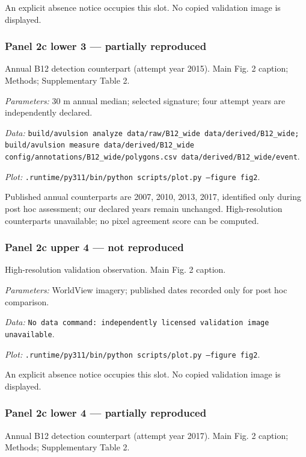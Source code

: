 An explicit absence notice occupies this slot. No copied validation image is displayed.

\subsubsection*{Panel 2c lower 3 --- partially reproduced}
Annual B12 detection counterpart (attempt year 2015). Main Fig. 2 caption; Methods; Supplementary Table 2.

\textit{Parameters:} 30 m annual median; selected signature; four attempt years are independently declared.

\textit{Data:} \texttt{build/\allowbreak{}avulsion analyze data/\allowbreak{}raw/\allowbreak{}B12\_wide data/\allowbreak{}derived/\allowbreak{}B12\_wide; build/\allowbreak{}avulsion measure data/\allowbreak{}derived/\allowbreak{}B12\_wide config/\allowbreak{}annotations/\allowbreak{}B12\_wide/\allowbreak{}polygons.csv data/\allowbreak{}derived/\allowbreak{}B12\_wide/\allowbreak{}event}.

\textit{Plot:} \texttt{.runtime/\allowbreak{}py311/\allowbreak{}bin/\allowbreak{}python scripts/\allowbreak{}plot.py --figure fig2}.

Published annual counterparts are 2007, 2010, 2013, 2017, identified only during post hoc assessment; our declared years remain unchanged. High-resolution counterparts unavailable; no pixel agreement score can be computed.

\subsubsection*{Panel 2c upper 4 --- not reproduced}
High-resolution validation observation. Main Fig. 2 caption.

\textit{Parameters:} WorldView imagery; published dates recorded only for post hoc comparison.

\textit{Data:} \texttt{No data command: independently licensed validation image unavailable}.

\textit{Plot:} \texttt{.runtime/\allowbreak{}py311/\allowbreak{}bin/\allowbreak{}python scripts/\allowbreak{}plot.py --figure fig2}.

An explicit absence notice occupies this slot. No copied validation image is displayed.

\subsubsection*{Panel 2c lower 4 --- partially reproduced}
Annual B12 detection counterpart (attempt year 2017). Main Fig. 2 caption; Methods; Supplementary Table 2.

